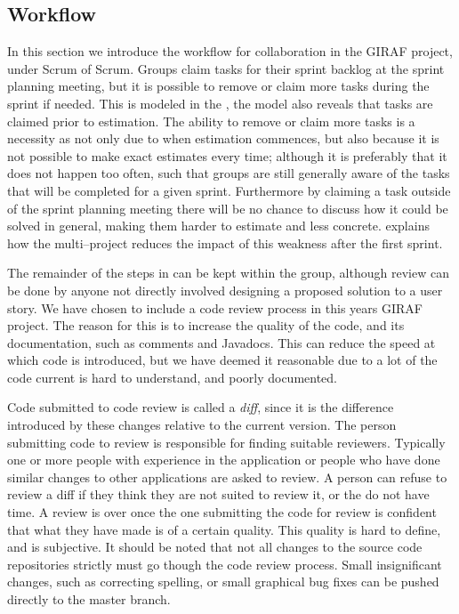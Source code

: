 \subsection{Workflow}
In this section we introduce the workflow for collaboration in the GIRAF project, under Scrum of Scrum.
Groups claim tasks for their sprint backlog at the sprint planning meeting, but it is possible to remove or claim more tasks during the sprint if needed.
This is modeled in the , the model also reveals that tasks are claimed prior to estimation.
The ability to remove or claim more tasks is a necessity as not only due to when estimation commences, but also because it is not possible to make exact estimates every time; although it is preferably that it does not happen too often, such that groups are still generally aware of the tasks that will be completed for a given sprint.
Furthermore by claiming a task outside of the sprint planning meeting there will be no chance to discuss how it could be solved in general, making them harder to estimate and less concrete.
 explains how the multi--project reduces the impact of this weakness after the first sprint.

\bigskip
The remainder of the steps in  can be kept within the group, although review can be done by anyone not directly involved designing a proposed solution to a user story.
We have chosen to include a code review process in this years GIRAF project.
The reason for this is to increase the quality of the code, and its documentation, such as comments and Javadocs.
This can reduce the speed at which code is introduced, but we have deemed it reasonable due to a lot of the code current is hard to understand, and poorly documented.

Code submitted to code review is called a \textit{diff}, since it is the difference introduced by these changes relative to the current version.
The person submitting code to review is responsible for finding suitable reviewers.
Typically one or more people with experience in the application or people who have done similar changes to other applications are asked to review.
A person can refuse to review a diff if they think they are not suited to review it, or the do not have time.
A review is over once the one submitting the code for review is confident that what they have made is of a certain quality.
This quality is hard to define, and is subjective.
It should be noted that not all changes to the source code repositories strictly must go though the code review process.
Small insignificant changes, such as correcting spelling, or small graphical bug fixes can be pushed directly to the master branch.


